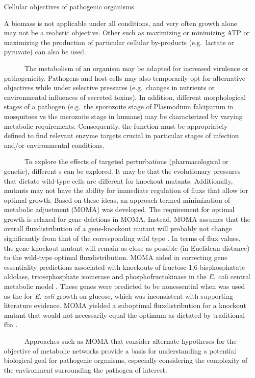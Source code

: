 \begin{pabox}[label=trends:box:objective,float*=t,width=\textwidth]{Cellular objectives of pathogenic organisms}
\small
\begin{multicols}{2}
A \gls{biomass} is not applicable under 
all conditions, and very often growth alone may not be 
a realistic objective. Other  such as maximizing 
or minimizing ATP or maximizing the production of 
particular cellular by-products (e.g.\ lactate or pyruvate) 
can also be used.

~~~~~~The metabolism of an organism may be adapted for increased 
virulence or pathogenicity. Pathogens and host cells may 
also temporarily opt for alternative objectives while under 
selective pressures (e.g.\ changes in nutrients or 
environmental influences of secreted toxins). In addition, 
different morphological stages of a pathogen (e.g.\ the sporozoite 
stage of Plasmodium falciparum in mosquitoes vs the merozoite 
stage in humans) may be characterized by varying metabolic 
requirements. Consequently, the  function must be 
appropriately defined to find relevant enzyme targets crucial 
in particular stages of infection and/or environmental conditions.

~~~~~~To explore the effects of targeted perturbations 
(pharmacological or genetic), different s 
can be explored. It may be that the evolutionary 
pressures that dictate wild-type cells are different 
for knockout mutants. Additionally, mutants may 
not have the ability for immediate regulation of 
\glspl{flux} that allow for optimal growth. Based on these 
ideas, an approach termed minimization of metabolic 
adjustment (MOMA) was developed. The requirement for 
optimal growth is relaxed for gene deletions in MOMA. 
Instead, MOMA assumes that the overall \gls{fluxdistribution} 
of a gene-knockout mutant will probably not change 
significantly from that of the corresponding wild type \cite{Segre:2002jp}. 
In terms of \gls{flux} values, the gene-knockout mutant will 
remain as close as possible (in Euclidean distance) to 
the wild-type optimal \gls{fluxdistribution}. MOMA aided in correcting 
gene essentiality predictions associated with knockouts 
of fructose-1,6-bisphosphatate aldolase, triosephosphate 
isomerase and phosphofructokinase in the \textit{E. coli }
central metabolic model \cite{Segre:2002jp}. These genes were predicted 
to be nonessential when  was used as the  
for \textit{E. coli} growth on glucose, which was inconsistent with 
supporting literature evidence. MOMA yielded a suboptimal 
\gls{fluxdistribution} for a knockout mutant that would not 
necessarily equal the optimum as dictated by traditional 
\gls{fba} \cite{Segre:2002jp}.

~~~~~~Approaches such as MOMA that consider alternate hypotheses 
for the objective of metabolic networks provide a basis 
for understanding a potential biological goal for pathogenic 
organisms, especially considering the complexity of the 
environment surrounding the pathogen of interest.
\end{multicols}

\end{pabox}

